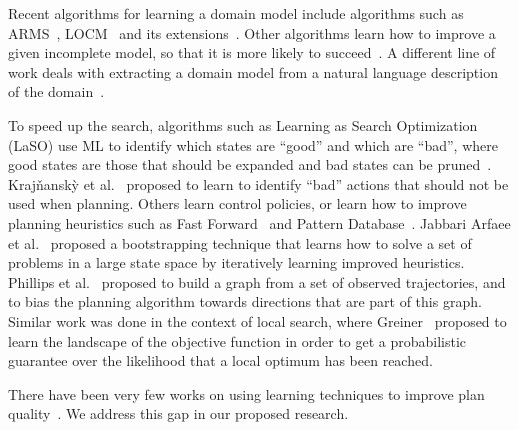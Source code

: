 \documentclass[12pt]{article}
\begin{document}
 Recent algorithms for learning a domain model include algorithms such as ARMS~\cite{yang2007learning}, 
LOCM~\cite{cresswell2013acquiring} and its extensions~\cite{gregory2015domain,gregory2016domain}. 
Other algorithms learn how to improve a given incomplete model, so that it is more likely to succeed~\cite{nguyen2017robustPlanning,jimenez2012review}.
A different line of work deals with extracting a domain model from a natural language description of the domain~\cite{lindsay2017framer}.

To speed up the search, algorithms such as Learning as Search Optimization (LaSO) use ML to identify which states are ``good'' and which are ``bad'', where good states are those that should be expanded and bad states can be pruned~\cite{xu2007discriminative}. %
Kraj{\v{n}}ansk{\`y} et al.~\cite{krajvnansky2014learning} proposed to learn to identify ``bad'' actions that should not be used when planning. 
Others learn control policies, or learn how to improve planning heuristics such as Fast Forward~\cite{yoon2008learning} and Pattern Database~\cite{samadi2008learning}. Jabbari Arfaee et al.~\cite{arfaee2011learning} proposed a bootstrapping technique that learns how to solve a set of problems in a large state space by iteratively learning improved heuristics. 
Phillips et al.~\cite{phillips2012graphs} proposed to build a graph from a set of observed trajectories, and to bias the planning algorithm towards directions that are part of this graph. Similar work was done in the context of local search, 
where Greiner~\cite{greiner1996palo} proposed to learn
the landscape of the objective function in order to get a probabilistic guarantee over the likelihood that a local optimum has been reached. 

 There have been very few works on using learning techniques to improve plan quality~\cite{zimmerman2003learning}. We address this gap in our proposed research. %
\end{document}
